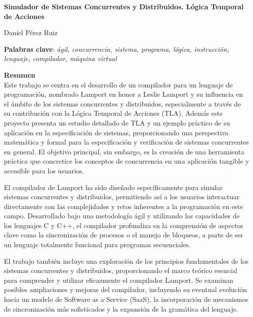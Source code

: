 \thispagestyle{empty}

\begin{center}
{\large\bfseries Simulador de Sistemas Concurrentes y Distribuidos. Lógica Temporal de Acciones }\\
\end{center}
\begin{center}
Daniel Pérez Ruiz\\
\end{center}


\vspace{0.5cm}
\noindent\textbf{Palabras clave}: \textit{ágil, concurrencia, sistema, programa, lógica, instrucción, lenguaje, compilador, máquina virtual}
\vspace{0.7cm}

\noindent\textbf{Resumen}\\
Este trabajo se centra en el desarrollo de un compilador para un lenguaje de programación, nombrado Lamport en honor a Leslie Lamport y su influencia en el ámbito de los sistemas concurrentes y distribuidos, especialmente a través de su contribución con la Lógica Temporal de Acciones (TLA). Además este proyecto presenta un estudio detallado de TLA y un ejemplo práctico de su aplicación en la especificación de sistemas, proporcionando una perspectiva matemática y formal para la especificación y verificación de sistemas concurrentes en general. El objetivo principal, sin embargo, es la creación de una herramienta práctica que concretice los conceptos de concurrencia en una aplicación tangible y accesible para los usuarios.

El compilador de Lamport ha sido diseñado específicamente para simular sistemas concurrentes y distribuidos, permitiendo así a los usuarios interactuar directamente con las complejidades y retos inherentes a la programación en este campo. Desarrollado bajo una metodología ágil y utilizando las capacidades de los lenguajes C y C++, el compilador profundiza en la comprensión de aspectos clave como la sincronización de procesos o el manejo de bloqueos, a parte de ser un lenguaje totalmente funcional para programas secuenciales.

El trabajo también incluye una exploración de los principios fundamentales de los sistemas concurrentes y distribuidos, proporcionando el marco teórico esencial para comprender y utilizar eficazmente el compilador Lamport. Se examinan posibles ampliaciones y mejoras del compilador, incluyendo su eventual evolución hacia un modelo de Software as a Service (SaaS), la incorporación de mecanismos de sincronización más sofisticados y la expansión de la gramática del lenguaje.

